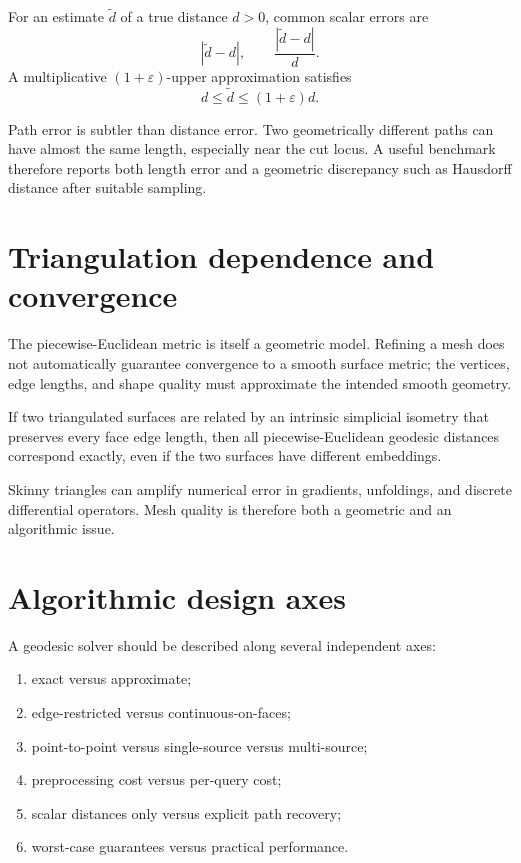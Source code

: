 \begin{definition}\label{def:vii38-error}
For an estimate \(\widetilde d\) of a true distance \(d>0\), common scalar errors
are
\[
|\widetilde d-d|,
\qquad
\frac{|\widetilde d-d|}{d}.
\]
A multiplicative \((1+\varepsilon)\)-upper approximation satisfies
\[
d\le \widetilde d\le(1+\varepsilon)d.
\]
\end{definition}

Path error is subtler than distance error.  Two geometrically different paths can
have almost the same length, especially near the cut locus.  A useful benchmark
therefore reports both length error and a geometric discrepancy such as Hausdorff
distance after suitable sampling.

\section{Triangulation dependence and convergence}

The piecewise-Euclidean metric is itself a geometric model.  Refining a mesh does
not automatically guarantee convergence to a smooth surface metric; the vertices,
edge lengths, and shape quality must approximate the intended smooth geometry.

\begin{proposition}\label{prop:vii38-intrinsic}
If two triangulated surfaces are related by an intrinsic simplicial isometry that
preserves every face edge length, then all piecewise-Euclidean geodesic distances
correspond exactly, even if the two surfaces have different embeddings.
\end{proposition}

\begin{remark}
Skinny triangles can amplify numerical error in gradients, unfoldings, and
discrete differential operators.  Mesh quality is therefore both a geometric and
an algorithmic issue.
\end{remark}

\section{Algorithmic design axes}

A geodesic solver should be described along several independent axes:
\begin{enumerate}[label=(\arabic*)]
\item exact versus approximate;
\item edge-restricted versus continuous-on-faces;
\item point-to-point versus single-source versus multi-source;
\item preprocessing cost versus per-query cost;
\item scalar distances only versus explicit path recovery;
\item worst-case guarantees versus practical performance.
\end{enumerate}

